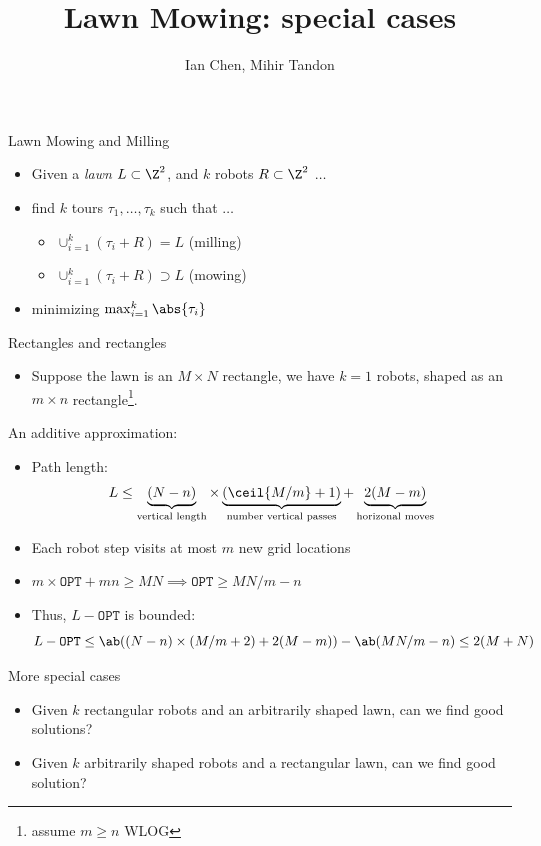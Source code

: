 \documentclass[aspectratio=169]{beamer}
\title{Lawn Mowing: special cases}
\author{Ian Chen, Mihir Tandon}
\date{}
\begin{document}

\begin{frame}
    \titlepage
\end{frame}

\begin{frame}{Lawn Mowing and Milling}
    \begin{itemize}
        \item Given a \emph{lawn} $L \subset \Z^2$, and $k$ robots $R \subset \Z^2$ $\ldots$
        \item find $k$ tours $\tau_1, \ldots, \tau_k$ such that $\ldots$
              \begin{itemize}
                  \item $\cup_{i=1}^k (\tau_i + R) = L$ (milling)
                  \item $\cup_{i=1}^k (\tau_i + R) \supset L$ (mowing)
              \end{itemize}
        \item minimizing $\max_{i=1}^k \abs{\tau_i}$
    \end{itemize}
\end{frame}

\begin{frame}{Rectangles and rectangles}
    \begin{itemize}
        \item Suppose the lawn is an $M \times N$ rectangle, we have $k=1$ robots, shaped as an $m \times n$ rectangle\footnote{assume $m \ge n$ WLOG}.
    \end{itemize}
\end{frame}



\begin{frame}{An additive approximation:}
    \begin{itemize}
        \item Path length:
              $$
                  L \le \underbrace{(N - n)}_{\text{vertical length}} \times \underbrace{(\ceil{M/m} + 1)}_{\text{number vertical passes}} + \underbrace{2(M - m)}_{\text{horizonal moves}}
              $$
        \item Each robot step visits at most $m$ new grid locations
        \item $m \times \texttt{OPT} + mn \ge MN \implies \texttt{OPT} \ge MN / m - n$
        \item Thus, $L - \texttt{OPT}$ is bounded:
              $$
                  L - \texttt{OPT} \le \ab( (N - n) \times (M/m + 2) + 2(M - m) ) - \ab( MN / m - n ) \le 2(M+N)
              $$
    \end{itemize}
\end{frame}

\begin{frame}{More special cases}
    \begin{itemize}
        \item Given $k$ rectangular robots and an arbitrarily shaped lawn, can we find good solutions?
        \item Given $k$ arbitrarily shaped robots and a rectangular lawn, can we find good solution?
    \end{itemize}
\end{frame}
\end{document}
